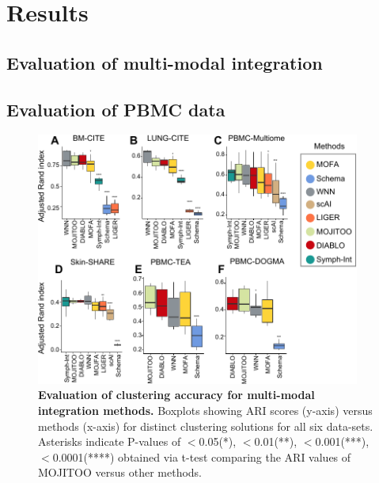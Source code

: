 \section{Results}
\subsection{Evaluation of multi-modal integration}
\subsection{Evaluation of PBMC data}

\begin{figure}[!ht]
	\centering
	\includegraphics[width=0.95\textwidth]{ari/fig}
	\vspace{0.1cm}
	\caption[Evaluation of clustering accuracy for multi-modal integration methods.]{
	\textbf{Evaluation of clustering accuracy for multi-modal integration methods.} Boxplots showing ARI scores (y-axis) versus methods (x-axis) for distinct clustering solutions for all six data-sets. Asterisks indicate P-values of $<$0.05(*), $<$0.01(**), $<$0.001(***), $<$0.0001(****) obtained via t-test comparing the ARI values of MOJITOO versus other methods. }
	\label{fig:ari}
\end{figure}


